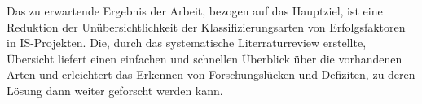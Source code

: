 Das zu erwartende Ergebnis der Arbeit, bezogen auf das Hauptziel, ist eine Reduktion der Unübersichtlichkeit der Klassifizierungsarten von Erfolgsfaktoren in IS-Projekten.
Die, durch das systematische Literraturreview erstellte, Übersicht liefert einen einfachen und schnellen Überblick über die vorhandenen Arten und erleichtert das Erkennen von Forschungslücken und Defiziten,
zu deren Lösung dann weiter geforscht werden kann.